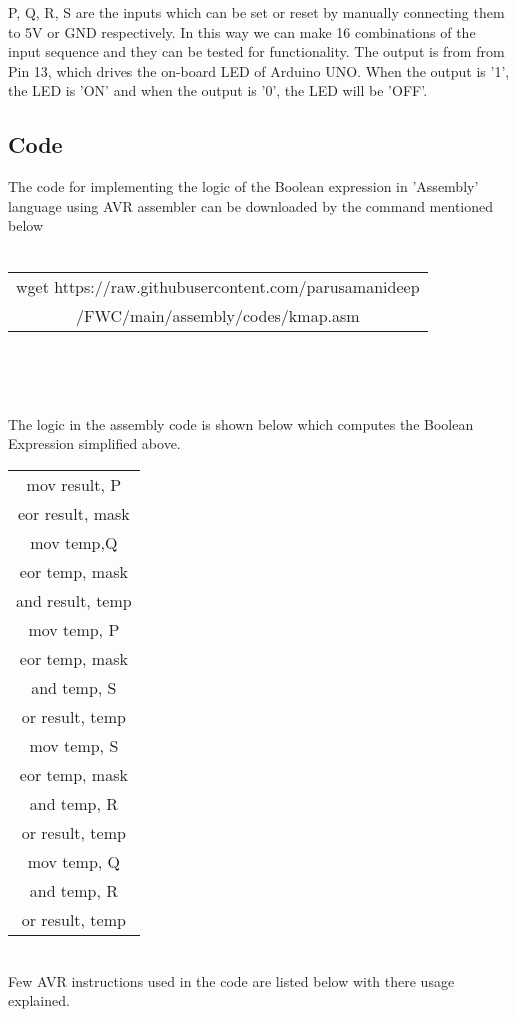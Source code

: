 \documentclass[journal,12pt,twocolumn]{IEEEtran}
\begin{document}
P, Q, R, S are the inputs which can be set or reset by manually connecting them to 5V or GND respectively. In this way we can make 16 combinations of the input sequence and they can be tested for functionality.
The output is from from Pin 13, which drives the on-board LED of Arduino UNO. When the output is '1', the LED is 'ON' and when the output is '0', the LED will be 'OFF'.\\
 
\subsection{Code}
The code for implementing the logic of the Boolean expression in 'Assembly' language using AVR assembler can be downloaded by the command mentioned below \\ \\
\begin{table}[h]
\begin{tabular}{|c|}
    \hline
wget https://raw.githubusercontent.com/parusamanideep
\\/FWC/main/assembly/codes/kmap.asm\\
     \hline
\end{tabular}\\
\end{table}\\
\bigskip

The logic in the assembly code is shown below which computes the Boolean Expression simplified above.\\
\begin{table}[h]
\centering
\begin{tabular}{|c|}
\hline
mov result, P	\\
eor result, mask\\
mov temp,Q		\\
eor temp, mask\\
and result, temp\\

mov temp, P\\
eor temp, mask\\
and temp, S\\
or result, temp\\

mov temp, S\\
eor temp, mask\\
and temp, R\\
or result, temp\\

mov temp, Q\\
and temp, R\\
or result, temp\\
\hline
\end{tabular}
\end{table}\\
Few AVR instructions used in the code are listed below with there usage explained.\\
\end{document}

